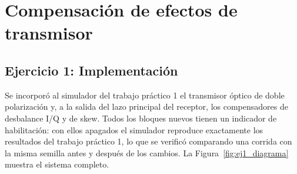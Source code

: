 
\section*{Compensación de efectos de transmisor}

\subsection*{Ejercicio 1: Implementación}

Se incorporó al simulador del trabajo práctico 1 el transmisor óptico de
doble polarización y, a la salida del lazo principal del receptor, los
compensadores de desbalance I/Q y de skew. Todos los bloques nuevos tienen
un indicador de habilitación: con ellos apagados el simulador reproduce
exactamente los resultados del trabajo práctico 1, lo que se verificó
comparando una corrida con la misma semilla antes y después de los
cambios. La Figura~\ref{fig:ej1_diagrama} muestra el sistema completo.

